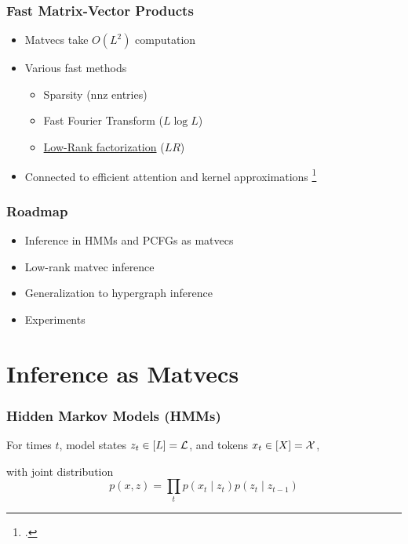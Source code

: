 \documentclass{beamer}
\begin{document}
\begin{frame}
\frametitle{Fast Matrix-Vector Products}
\begin{itemize}
\item Matvecs take $O(L^2)$ computation
\vspace{1em}
\item Various fast methods
    \begin{itemize}
    \item Sparsity (nnz entries)
    \item Fast Fourier Transform ($L \log L$)
    \item \underline{Low-Rank factorization} ($LR$)
    \end{itemize}
\vspace{1em}
\item Connected to efficient attention and kernel approximations
\footcite{performer,rfa,blanc2018adaptive}
\end{itemize}
\end{frame}

\begin{frame}
\frametitle{Roadmap}
\begin{itemize}
\item Inference in HMMs and PCFGs as matvecs
\vspace{1em}
\item Low-rank matvec inference
\vspace{1em}
\item Generalization to hypergraph inference
\vspace{1em}
\item Experiments
\end{itemize}
\end{frame}

\section{Inference as Matvecs}

\begin{frame}
\frametitle{Hidden Markov Models (HMMs)}

For times $t$, model states $z_t \in [L] = \mathcal{L}$, and tokens $x_t \in [X] = \mathcal{X}$,

\vspace{1em}

\begin{center}
\end{center}

\vspace{1em}
with joint distribution
$$p(x,z) = \prod_t p(x_t \mid z_t)p(z_t \mid z_{t-1})$$
\end{frame}
\end{document}
